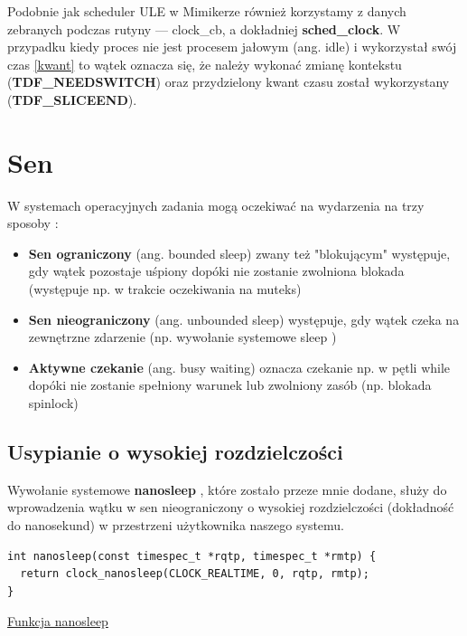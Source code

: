 \documentclass[shortabstract]{iithesis}
\theoremstyle{definition} \newtheorem*{definition}{Definicja}
\theoremstyle{definition} \newtheorem*{example}{Przykład}
\theoremstyle{definition} \newtheorem*{remark}{Uwaga}
\newenvironment{longlisting}{\captionsetup{type=listing}}{}
\begin{document}
Podobnie jak scheduler ULE w Mimikerze również korzystamy z danych zebranych podczas rutyny --- clock\_cb, a dokładniej \textbf{sched\_clock}. W przypadku kiedy proces nie jest procesem jałowym (ang. idle) i wykorzystał swój czas \ref{kwant} to wątek oznacza się, że należy wykonać zmianę kontekstu (\textbf{TDF\_NEEDSWITCH}) oraz przydzielony kwant czasu został wykorzystany (\textbf{TDF\_SLICEEND}).

\section{Sen}

W systemach operacyjnych zadania mogą oczekiwać na wydarzenia na trzy sposoby \cite{bib:locking-manual}:
\begin{itemize}
    \item \textbf{Sen ograniczony} (ang. bounded sleep) zwany też "blokującym" występuje, gdy wątek pozostaje uśpiony dopóki nie zostanie zwolniona blokada (występuje np. w trakcie oczekiwania na muteks)
    \item \textbf{Sen nieograniczony} (ang. unbounded sleep) występuje, gdy wątek czeka na zewnętrzne zdarzenie (np. wywołanie systemowe sleep \cite{bib:sleep-manual})
    \item \textbf{Aktywne czekanie} (ang. busy waiting) oznacza czekanie np. w pętli while dopóki nie zostanie spełniony warunek lub zwolniony zasób (np. blokada spinlock)
\end{itemize}

\subsection{Usypianie o wysokiej rozdzielczości}

Wywołanie systemowe \textbf{nanosleep} \cite{bib:nanosleep-manual}, które zostało przeze mnie dodane, służy do wprowadzenia wątku w sen nieograniczony o wysokiej rozdzielczości (dokładność do nanosekund) w przestrzeni użytkownika naszego systemu.

\begin{longlisting}
  \begin{verbatim}
int nanosleep(const timespec_t *rqtp, timespec_t *rmtp) {
  return clock_nanosleep(CLOCK_REALTIME, 0, rqtp, rmtp);
}
  \end{verbatim}
  \caption{\href{https://mimiker.ii.uni.wroc.pl/source/xref/mimiker/lib/libc/sys/nanosleep.c?r=bea91cda\#3}{Funkcja nanosleep}}
  \label{lst:funcnanosleep}
\end{longlisting}
\end{document}
